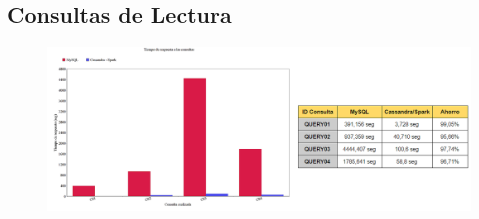 \subsection{Consultas de Lectura}
 
 \begin{figure}[h]
 	\centering
 	\includegraphics[width=1\textwidth]{Ilustraciones/TiempoRespuestaConsultas.png}
 \end{figure}
 
 


